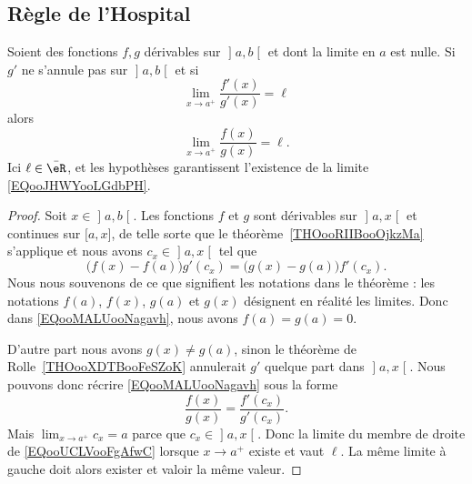 \subsection{Règle de l'Hospital}

\begin{proposition}     \label{PROPooBZHTooHmyGsy}
Soient des fonctions \( f,g\) dérivables sur \( \mathopen] a , b \mathclose[\) et dont la limite en \( a\) est nulle. Si \( g'\) ne s'annule pas sur \( \mathopen] a , b \mathclose[\) et si
    \begin{equation}
        \lim_{x\to a^+} \frac{ f'(x) }{ g'(x) }=\ell
    \end{equation}
    alors
    \begin{equation}        \label{EQooJHWYooLGdbPH}
        \lim_{x\to a^+} \frac{ f(x) }{ g(x) }=\ell.
    \end{equation}
    Ici \( \ell\in \bar \eR\), et les hypothèses garantissent l'existence de la limite \eqref{EQooJHWYooLGdbPH}.
\end{proposition}

\begin{proof}
Soit \( x\in\mathopen] a , b \mathclose[\). Les fonctions \( f\) et \( g\) sont dérivables sur \( \mathopen] a , x \mathclose[\) et continues sur \( \mathopen[ a , x \mathclose]\), de telle sorte que le théorème~\ref{THOooRIIBooOjkzMa} s'applique et nous avons \( c_x\in \mathopen] a , x \mathclose[\) tel que
    \begin{equation}        \label{EQooMALUooNagavh}
        \big( f(x)-f(a) \big)g'(c_x)=\big( g(x)-g(a) \big)f'(c_x).
    \end{equation}
    Nous nous souvenons de ce que signifient les notations dans le théorème : les notations \( f(a)\), \( f(x)\), \( g(a)\) et \( g(x)\) désignent en réalité les limites. Donc dans \eqref{EQooMALUooNagavh}, nous avons \( f(a)=g(a)=0\).

D'autre part nous avons \( g(x)\neq g(a)\), sinon le théorème de Rolle~\ref{THOooXDTBooFeSZoK} annulerait \( g'\) quelque part dans \( \mathopen] a , x \mathclose[\). Nous pouvons donc récrire \eqref{EQooMALUooNagavh} sous la forme
    \begin{equation}        \label{EQooUCLVooFgAfwC}
        \frac{ f(x) }{ g(x) }=\frac{ f'(c_x) }{ g'(c_x) }.
    \end{equation}
Mais \( \lim_{x\to a^+} c_x=a\) parce que \( c_x\in\mathopen] a , x \mathclose[\). Donc la limite du membre de droite de \eqref{EQooUCLVooFgAfwC} lorsque \( x\to a^+\) existe et vaut \( \ell\). La même limite à gauche doit alors exister et valoir la même valeur.
\end{proof}

